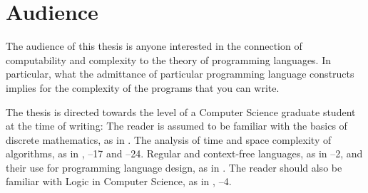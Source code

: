 
\section{Audience}

The audience of this thesis is anyone interested in the connection of
computability and complexity to the theory of programming languages. In
particular, what the admittance of particular programming language constructs
implies for the complexity of the programs that you can write.

\def\chs{\textsection\textsection}

The thesis is directed towards the level of a Computer Science graduate student
at the time of writing: The reader is assumed to be familiar with the basics of
discrete mathematics, as in \cite{graham-et-al-1998}. The analysis of time and
space complexity of algorithms, as in \cite{cormen-et-al-2009}, \chs1--17 and
\chs21--24. Regular and context-free languages, as in \cite{sipser-2013}
\chs1--2, and their use for programming language design, as in
\cite{mogensen-2010}. The reader should also be familiar with Logic in Computer
Science, as in \cite{huth-ryan-2004}, \chs1--4.
